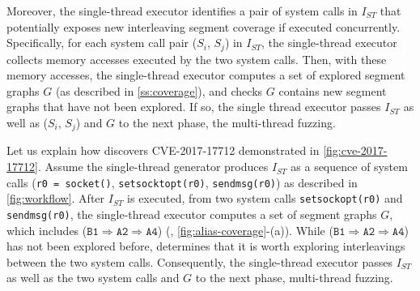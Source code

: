 Moreover, the single-thread executor identifies a pair of system calls
in $I_{ST}$ that potentially exposes new interleaving segment coverage
if executed concurrently.
%
Specifically, for each system call pair ($S_i$, $S_j$) in $I_{ST}$,
the single-thread executor collects memory accesses executed by the
two system calls. Then, with these memory accesses, the single-thread
executor computes a set of explored segment graphs $G$ (as described
in \autoref{ss:coverage}), and checks $G$ contains new segment graphs
that have not been explored.
%
If so, the single thread executor passes $I_{ST}$ as well as ($S_i$,
$S_j$) and $G$ to the next phase, the multi-thread fuzzing.


%
Let us explain how \sys discovers CVE-2017-17712 demonstrated in
\autoref{fig:cve-2017-17712}.
%
Assume the single-thread generator produces $I_{ST}$ as a sequence of
system calls (\texttt{r0 = socket()}, \texttt{setsocktopt(r0)},
\texttt{sendmsg(r0)}) as described in \autoref{fig:workflow}.
%
After $I_{ST}$ is executed, from two system calls
\texttt{setsockopt(r0)} and \texttt{sendmsg(r0)}, the single-thread
executor computes a set of segment graphs $G$, which includes
($\texttt{B1} \Rightarrow \texttt{A2} \Rightarrow \texttt{A4}$) (\ie,
\autoref{fig:alias-coverage}-(a)).
%
While ($\texttt{B1} \Rightarrow \texttt{A2} \Rightarrow \texttt{A4}$)
has not been explored before, \sys determines that it is worth
exploring interleavings between the two system calls.
%
Consequently, the single-thread executor passes $I_{ST}$ as well as
the two system calls and $G$ to the next phase, multi-thread fuzzing.



%





